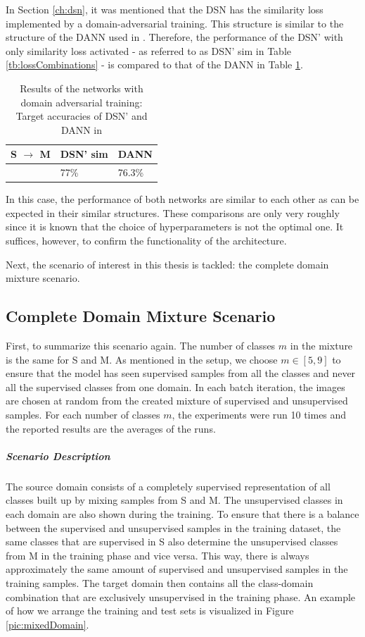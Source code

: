 In Section \ref{ch:dsn}, it was mentioned that the DSN has the similarity loss implemented by a domain-adversarial training. This structure is similar to the structure of the DANN used in \cite{domainMixture}. Therefore, the performance of the DSN' with only similarity loss activated - as referred to as DSN' sim in Table \ref{tb:lossCombinations} - is compared to that of the DANN in Table \ref{tb:simresults}.
\begin{table}[h!]
\begin{center}
\begin{tabular}{l|ll}
S $\rightarrow$ M & DSN' sim & DANN   \\ \hline
                  & 77\%     & 76.3\% \\ 
\end{tabular}
\end{center}
\caption{Results of the networks with domain adversarial training: Target accuracies of DSN' and DANN in \cite{domainMixture}}
\label{tb:simresults}
\end{table}
In this case, the performance of both networks are similar to each other as can be expected in their similar structures. These comparisons are only very roughly since it is known that the choice of hyperparameters is not the optimal one. It suffices, however, to confirm the functionality of the architecture. 

Next, the scenario of interest in this thesis is tackled: the complete domain mixture scenario.

\subsection*{Complete Domain Mixture Scenario}
First, to summarize this scenario again. The number of classes $m$ in the mixture is the same for S and M.  As mentioned in the setup, we choose $m \in [5, 9]$ to ensure that the model has seen supervised samples from all the classes and never all the supervised classes from one domain. In each batch iteration, the images are chosen at random from the created mixture of supervised and unsupervised samples. For each number of classes $m$, the experiments were run 10 times and the reported results are the averages of the runs.

\subparagraph*{Scenario Description} The source domain consists of a completely supervised representation of all classes built up by mixing samples from S and M. The unsupervised classes in each domain are also shown during the training. To ensure that there is a balance between the supervised and unsupervised samples in the training dataset, the same classes that are supervised in S also determine the unsupervised classes from M in the training phase and vice versa. This way, there is always approximately the same amount of supervised and unsupervised samples in the training samples. The target domain then contains all the class-domain combination that are exclusively unsupervised in the training phase. An example of how we arrange the training and test sets is visualized in Figure \ref{pic:mixedDomain}.

